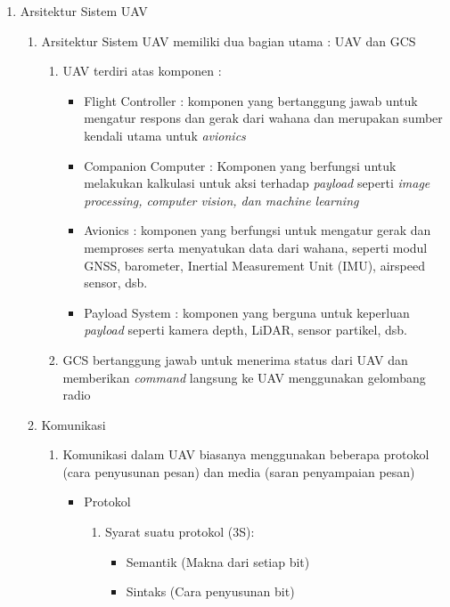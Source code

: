 \documentclass{article}
\begin{document}
\begin{enumerate}
        \item Arsitektur Sistem UAV
        \begin{enumerate}
            \item Arsitektur Sistem UAV memiliki dua bagian utama : UAV dan GCS
            \begin{enumerate}
                \item UAV terdiri atas komponen :
                \begin{itemize}
                    \item Flight Controller : komponen yang bertanggung jawab untuk mengatur respons dan gerak dari wahana dan merupakan sumber kendali utama untuk \textit{avionics}
                    \item Companion Computer : Komponen yang berfungsi untuk melakukan kalkulasi untuk aksi terhadap \textit{payload} seperti \textit{image processing, computer vision, dan machine learning}
                    \item Avionics : komponen yang berfungsi untuk mengatur gerak dan memproses serta menyatukan data dari wahana, seperti modul GNSS, barometer, Inertial Measurement Unit (IMU), airspeed sensor, dsb.
                    \item Payload System : komponen yang berguna untuk keperluan \textit{payload} seperti kamera depth, LiDAR, sensor partikel, dsb.
                \end{itemize}
                \item GCS bertanggung jawab untuk menerima status dari UAV dan memberikan \textit{command} langsung ke UAV menggunakan gelombang radio
            \end{enumerate}
            \item Komunikasi
            \begin{enumerate}
                \item Komunikasi dalam UAV biasanya menggunakan beberapa protokol (cara penyusunan pesan) dan media (saran penyampaian pesan)
                \begin{itemize}
                    \item Protokol
                    \begin{enumerate}
                        \item Syarat suatu protokol (3S):
                        \begin{itemize}
                            \item Semantik (Makna dari setiap bit)
                            \item Sintaks (Cara penyusunan bit)

\end{itemize}
\end{enumerate}
\end{itemize}
\end{enumerate}
\end{enumerate}
\end{enumerate}
\end{document}
